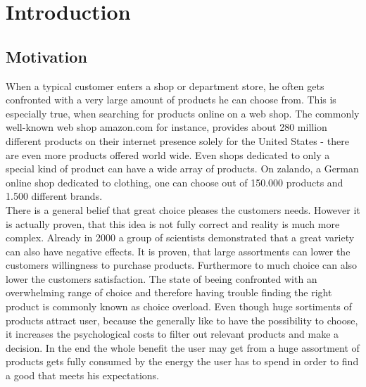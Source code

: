 
\section{Introduction}


\subsection{Motivation}
When a typical customer enters a shop or department store, he often gets confronted with a very large amount of products he can choose from.
This is especially true, when searching for products online on a web shop.
The commonly well-known web shop \gls{amazon.com} for instance, provides about 280 million different products on their internet presence solely for the United States - there are even more products offered world wide.\citep{marketplaceanalytics:2014}
Even shops dedicated to only a special kind of product can have a wide array of products.
On \gls{zalando}, a German online shop dedicated to clothing, one can choose out of 150.000 products and 1.500 different brands.\citep{visser:2014}\\

There is a general belief that great choice pleases the customers needs.
However it is actually proven, that this idea is not fully correct and reality is much more complex.
Already in 2000 a group of scientists demonstrated that a great variety can also have negative effects.
It is proven, that large assortments can lower the customers willingness to purchase products.\citep[p.~312-313]{diehl:2010}
Furthermore to much choice can also lower the customers satisfaction.\citep[p.~320]{diehl:2010}
The state of beeing confronted with an overwhelming range of choice and therefore having trouble finding the right product is commonly known as choice overload.\citep[p.~454]{stanton:2012}
Even though huge sortiments of products attract user, because the generally like to have the possibility to choose, it increases the psychological costs to filter out relevant products and make a decision.
In the end the whole benefit the user may get from a huge assortment of products gets fully consumed by the energy the user has to spend in order to find a good that meets his expectations.
\citep[p.~64]{bollen:2010}

